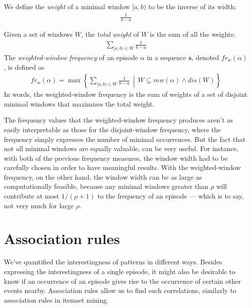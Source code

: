 \begin{definition}
We define the \emph{weight} of a minimal window $ [a, b) $ to be the inverse of its width:
\begin{align*}
\frac1{b - a}
\end{align*}

Given a set of windows $ W $, the \emph{total weight} of $ W $ is the sum of all the weights:
\begin{align*}
\sum_{[a,b) \in W} \frac1{b - a}
\end{align*}
The \emph{weighted-window frequency} \cite{cule2014marbles} of an episode $ \alpha $ in a sequence $ \boldsymbol{s} $, denoted $ fr_w(\alpha) $, is defined as
\begin{align*}
fr_w(\alpha) = \max \left\{ \sum_{[a, b) \in W}{\frac{1}{b - a}} \,\middle\vert\, W \subseteq mw(\alpha) \wedge dis(W) \right \}
\end{align*}
In words, the weighted-window frequency is the sum of weights of a set of disjoint minimal windows that maximizes the total weight.
\end{definition}

The frequency values that the weighted-window frequency produces aren't as easily interpretable as those for the disjoint-window frequency, where the frequency simply expresses the number of minimal occurrences. But the fact that not all minimal windows are equally valuable, can be very useful. For instance, with both of the previous frequency measures, the window width had to be carefully chosen in order to have meaningful results. With the weighted-window frequency, on the other hand, the window width can be as large as computationally feasible, because any minimal windows greater than $ \rho $ will contribute at most $ 1 / (\rho + 1) $ to the frequency of an episode --- which is to say, not very much for large $ \rho $.



\section{Association rules}

We've quantified the interestingness of patterns in different ways. Besides expressing the interestingness of a single episode, it might also be desirable to know if an occurrence of an episode gives rise to the occurrence of certain other events nearby. Association rules allow us to find such correlations, similarly to association rules in itemset mining.

